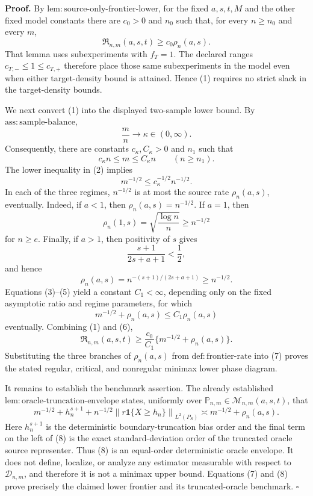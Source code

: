 \textbf{Proof.}
By \(\mathrm{lem:source\text{-}only\text{-}frontier\text{-}lower}\), for the fixed \(a,s,t,M\) and the other fixed model constants there are \(c_0>0\) and \(n_0\) such that, for every \(n\ge n_0\) and every \(m\),
\[
 \mathfrak R_{n,m}(a,s,t)\ge c_0\rho_n(a,s).
\tag{1}
\]
That lemma uses subexperiments with \(f_T=1\). The declared ranges \(c_{T,-}\le 1\le c_{T,+}\) therefore place those same subexperiments in the model even when either target-density bound is attained. Hence (1) requires no strict slack in the target-density bounds.

We next convert (1) into the displayed two-sample lower bound. By \(\mathrm{ass:sample\text{-}balance}\),
\[
 \frac{m}{n}\longrightarrow\kappa\in(0,\infty).
\]
Consequently, there are constants \(c_\kappa,C_\kappa>0\) and \(n_1\) such that
\[
 c_\kappa n\le m\le C_\kappa n
 \qquad(n\ge n_1).
\tag{2}
\]
The lower inequality in (2) implies
\[
 m^{-1/2}\le c_\kappa^{-1/2}n^{-1/2}.
\tag{3}
\]
In each of the three regimes, \(n^{-1/2}\) is at most the source rate \(\rho_n(a,s)\), eventually. Indeed, if \(a<1\), then \(\rho_n(a,s)=n^{-1/2}\). If \(a=1\), then
\[
 \rho_n(1,s)=\sqrt{\frac{\log n}{n}}\ge n^{-1/2}
\tag{4}
\]
for \(n\ge e\). Finally, if \(a>1\), then positivity of \(s\) gives
\[
 \frac{s+1}{2s+a+1}<\frac12,
\]
and hence
\[
 \rho_n(a,s)=n^{-(s+1)/(2s+a+1)}\ge n^{-1/2}.
\tag{5}
\]
Equations (3)--(5) yield a constant \(C_1<\infty\), depending only on the fixed asymptotic ratio and regime parameters, for which
\[
 m^{-1/2}+\rho_n(a,s)\le C_1\rho_n(a,s)
\tag{6}
\]
eventually. Combining (1) and (6),
\[
 \mathfrak R_{n,m}(a,s,t)
 \ge \frac{c_0}{C_1}\{m^{-1/2}+\rho_n(a,s)\}.
\tag{7}
\]
Substituting the three branches of \(\rho_n(a,s)\) from \(\mathrm{def:frontier\text{-}rate}\) into (7) proves the stated regular, critical, and nonregular minimax lower phase diagram.

It remains to establish the benchmark assertion. The already established \(\mathrm{lem:oracle\text{-}truncation\text{-}envelope}\) states, uniformly over \(\mathbb P_{n,m}\in\mathcal M_{n,m}(a,s,t)\), that
\[
 m^{-1/2}+h_n^{s+1}
 +n^{-1/2}\left\|r\mathbf 1\{X\ge h_n\}\right\|_{L^2(P_S)}
 \asymp m^{-1/2}+\rho_n(a,s).
\tag{8}
\]
Here \(h_n^{s+1}\) is the deterministic boundary-truncation bias order and the final term on the left of (8) is the exact standard-deviation order of the truncated oracle source representer. Thus (8) is an equal-order deterministic oracle envelope. It does not define, localize, or analyze any estimator measurable with respect to \(\mathcal D_{n,m}\), and therefore it is not a minimax upper bound. Equations (7) and (8) prove precisely the claimed lower frontier and its truncated-oracle benchmark. \(\square\)
